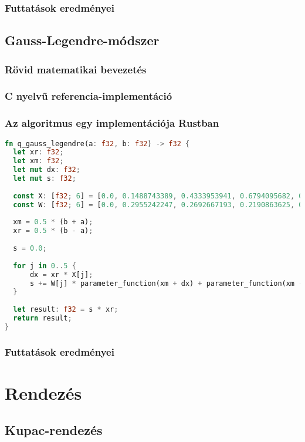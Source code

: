 \subsubsection{Futtatások eredményei} %

\subsection{Gauss-Legendre-módszer}
\subsubsection{Rövid matematikai bevezetés}
\subsubsection{C nyelvű referencia-implementáció}
\subsubsection{Az algoritmus egy implementációja Rustban}
\begin{lstlisting}[language=Rust]
fn q_gauss_legendre(a: f32, b: f32) -> f32 {
  let xr: f32;
  let xm: f32;
  let mut dx: f32;
  let mut s: f32;
  
  const X: [f32; 6] = [0.0, 0.1488743389, 0.4333953941, 0.6794095682, 0.8650633666,0.9739065285];
  const W: [f32; 6] = [0.0, 0.2955242247, 0.2692667193, 0.2190863625, 0.1494513491, 0.0666713443];
  
  xm = 0.5 * (b + a);
  xr = 0.5 * (b - a);
  
  s = 0.0;
  
  for j in 0..5 {
	  dx = xr * X[j];
	  s += W[j] * parameter_function(xm + dx) + parameter_function(xm - dx);
  }
  
  let result: f32 = s * xr;
  return result;
}  
\end{lstlisting}
\subsubsection{Futtatások eredményei} %

\section{Rendezés}

\subsection{Kupac-rendezés}
